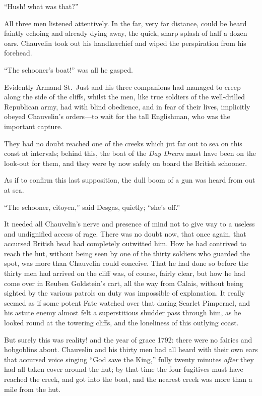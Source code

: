 \documentclass[paper=a5,BCOR=7mm,twoside,DIV=calc,12pt,usegeometry,chapterprefix,endperiod,headings=big]{scrbook}
\begin{document}
\enquote{Hush! what was that?}

All three men listened attentively. In the far, very far distance, could be heard faintly echoing and already dying away, the quick, sharp splash of half a dozen oars. Chauvelin took out his handkerchief and wiped the perspiration from his forehead.

\enquote{The schooner's boat!} was all he gasped.

Evidently Armand St.~Just and his three companions had managed to creep along the side of the cliffs, whilst the men, like true soldiers of the well-drilled Republican army, had with blind obedience, and in fear of their lives, implicitly obeyed Chauvelin's orders---to wait for the tall Englishman, who was the important capture.

They had no doubt reached one of the creeks which jut far out to sea on this coast at intervals; behind this, the boat of the \textit{Day Dream} must have been on the look-out for them, and they were by now safely on board the British schooner.

As if to confirm this last supposition, the dull boom of a gun was heard from out at sea.

\enquote{The schooner, citoyen,} said Desgas, quietly; \enquote{she's off.}

It needed all Chauvelin's nerve and presence of mind not to give way to a useless and undignified access of rage. There was no doubt now, that once again, that accursed British head had completely outwitted him. How he had contrived to reach the hut, without being seen by one of the thirty soldiers who guarded the spot, was more than Chauvelin could conceive. That he had done so before the thirty men had arrived on the cliff was, of course, fairly clear, but how he had come over in Reuben Goldstein's cart, all the way from Calais, without being sighted by the various patrols on duty was impossible of explanation. It really seemed as if some potent Fate watched over that daring Scarlet Pimpernel, and his astute enemy almost felt a superstitious shudder pass through him, as he looked round at the towering cliffs, and the loneliness of this outlying coast.

But surely this was reality! and the year of grace 1792: there were no fairies and hobgoblins about. Chauvelin and his thirty men had all heard with their own ears that accursed voice singing \enquote{God save the King,} fully twenty minutes \textit{after} they had all taken cover around the hut; by that time the four fugitives must have reached the creek, and got into the boat, and the nearest creek was more than a mile from the hut.
\end{document}
